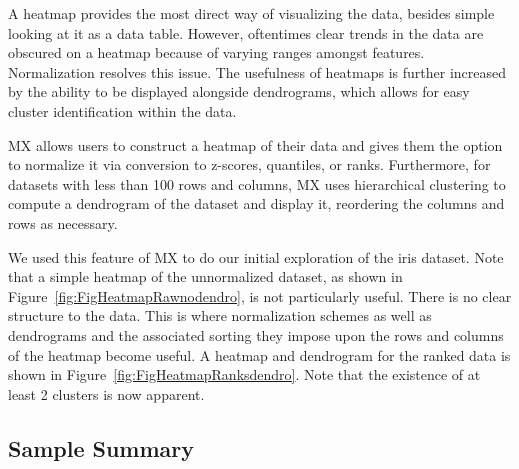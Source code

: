 \documentclass[12pt]{article}
\begin{document}
A heatmap provides the most direct way of visualizing the data, besides simple looking at it as a data table. However, oftentimes clear trends in the data are obscured on a heatmap because of varying ranges amongst features. Normalization resolves this issue. The usefulness of heatmaps is further increased by the ability to be displayed alongside dendrograms, which allows for easy cluster identification within the data.

MX allows users to construct a heatmap of their data and gives them the option to normalize it via conversion to z-scores, quantiles, or ranks. Furthermore, for datasets with less than 100 rows and columns, MX uses hierarchical clustering to compute a dendrogram of the dataset and display it, reordering the columns and rows as necessary. 

We used this feature of MX to do our initial exploration of the iris dataset. Note that a simple heatmap of the unnormalized dataset, as shown in Figure~\ref{fig:FigHeatmapRawnodendro}, is not particularly useful. There is no clear structure to the data. This is where normalization schemes as well as dendrograms and the associated sorting they impose upon the rows and columns of the heatmap become useful. A heatmap and dendrogram for the ranked data is shown in Figure~\ref{fig:FigHeatmapRanksdendro}. Note that the existence of at least 2 clusters is now apparent.

\subsection{Sample Summary}
\label{subsec:SubSecSample}
\end{document}
